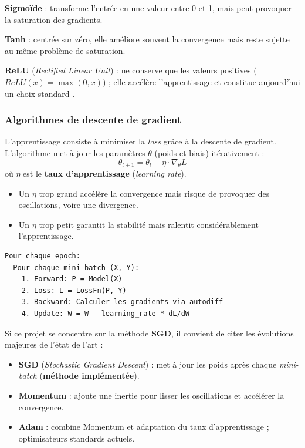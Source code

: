 \documentclass[a4paper,11pt]{article}
\begin{document}
\textbf{Sigmoïde} : transforme l'entrée en une valeur entre 0 et 1, mais peut provoquer la saturation des gradients. 

\textbf{Tanh} : centrée sur zéro, elle améliore souvent la convergence mais reste sujette au même problème de saturation. 

\textbf{ReLU} (\textit{Rectified Linear Unit}) : ne conserve que les valeurs positives ($ReLU(x) = \max(0, x)$) ; elle accélère l'apprentissage et constitue aujourd'hui un choix standard \cite{goodfellow2016}.

\subsubsection{Algorithmes de descente de gradient}\label{sec:theory_sgd}
L'apprentissage consiste à minimiser la \textit{loss} grâce à la descente de gradient. L'algorithme met à jour les paramètres $\theta$ (poids et biais) itérativement :
\[ \theta_{t+1} = \theta_t - \eta \cdot \nabla_\theta L \]
où $\eta$ est le \textbf{taux d'apprentissage} (\textit{learning rate}).
\begin{itemize}
    \item Un $\eta$ trop grand accélère la convergence mais risque de provoquer des oscillations, voire une divergence.
    \item Un $\eta$ trop petit garantit la stabilité mais ralentit considérablement l'apprentissage.
\end{itemize}

\begin{lstlisting}[language=pseudo, caption={Algorithme simplifié (SGD)}]
Pour chaque epoch:
  Pour chaque mini-batch (X, Y):
    1. Forward: P = Model(X)
    2. Loss: L = LossFn(P, Y)
    3. Backward: Calculer les gradients via autodiff
    4. Update: W = W - learning_rate * dL/dW
\end{lstlisting}

Si ce projet se concentre sur la méthode \textbf{SGD}, il convient de citer les évolutions majeures de l'état de l'art :
\begin{itemize}
    \item \textbf{SGD} (\textit{Stochastic Gradient Descent}) : met à jour les poids après chaque \textit{mini-batch} (\textbf{méthode implémentée}).
    \item \textbf{Momentum} : ajoute une inertie pour lisser les oscillations et accélérer la convergence.
    \item \textbf{Adam} : combine Momentum et adaptation du taux d'apprentissage ; optimisateurs standards actuels.
\end{itemize}
\end{document}
